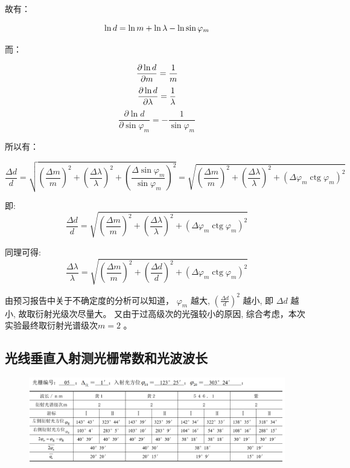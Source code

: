 \documentclass[UTF8]{ctexart}
\begin{document}
故有：

$$
\ln d=\ln m+\ln \lambda-\ln \sin \varphi_{m} \nonumber\\
$$

而：


$$  
\frac{\partial \ln d}{\partial m}=\frac{1}{m} \nonumber\\
$$
$$  
\frac{\partial \ln d}{\partial \lambda}=\frac{1}{\lambda} \nonumber\\
$$
$$
\frac{\partial \ln d}{\partial \sin \varphi_{m}}=-\frac{1}{\sin \varphi_{m}} \nonumber
$$

所以有：

$$
\frac{\Delta d}{d}=\sqrt{\left(\frac{\Delta m}{m}\right)^{2}+\left(\frac{\Delta \lambda}{\lambda}\right)^{2}+\left(\frac{\Delta \sin \varphi_{m}}{\sin \varphi_{m}}\right)^{2}}=\sqrt{\left(\frac{\Delta m}{m}\right)^{2}+\left(\frac{\Delta \lambda}{\lambda}\right)^{2}+\left(\Delta \varphi_{m} \operatorname{ctg} \varphi_{m}\right)^{2}}
$$

即:
$$
\frac{\Delta d}{d}=\sqrt{\left(\frac{\Delta m}{m}\right)^{2}+\left(\frac{\Delta \lambda}{\lambda}\right)^{2}+\left(\Delta \varphi_{m} \operatorname{ctg} \varphi_{m}\right)^{2}}
$$

同理可得:
$$
\frac{\Delta \lambda}{\lambda}=\sqrt{\left(\frac{\Delta m}{m}\right)^{2}+\left(\frac{\Delta d}{d}\right)^{2}+\left(\Delta \varphi_{m} \operatorname{ctg} \varphi_{m}\right)^{2}}
$$

  由预习报告中关于不确定度的分析可以知道， $\varphi_{m}$  越大,  $\left(\frac{\Delta d}{d}\right)^{2}$  越小, 即  $\Delta d $ 越小, 故取衍射光级次尽量大。 又由于过高级次的光强较小的原因, 综合考虑，本次实验最终取衍射光谱级次$m=2$ 。


\subsection{光线垂直入射测光栅常数和光波波长}

\begin{figure}[H]
  \centering
  \includegraphics[scale=0.7]{表格1.png}
\end{figure}
\end{document}
